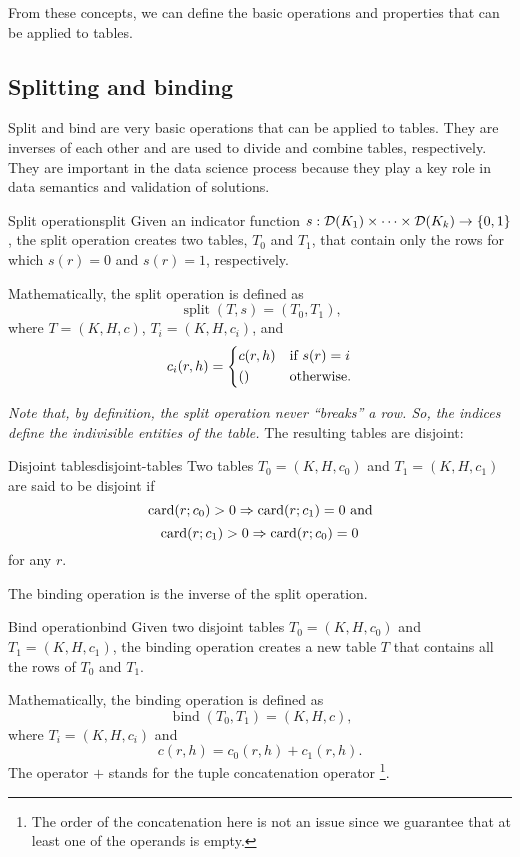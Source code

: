 From these concepts, we can define the basic operations and properties that can be applied
to tables.

\subsection{Splitting and binding}

Split and bind are very basic operations that can be applied to tables.  They are
inverses of each other and are used to divide and combine tables, respectively.
They are important in the data science process because they play a key role in
data semantics and validation of solutions.

\begin{defbox}{Split operation}{split}
Given an indicator function $s : \domainof{K_1} \times \dots \times \domainof{K_k} \to
\left\{0, 1\right\}$, the split operation creates two tables, $T_0$ and $T_1$, that
contain only the rows for which
$s(r) = 0$ and $s(r) = 1$, respectively.

Mathematically, the split operation is defined as \[
  \operatorname{split}(T, s) = \left(T_0, T_1\right)\text{,}
\] where $T = (K, H, c)$, $T_i = (K, H, c_i)$, and \[
  c_i(r, h) = \begin{dcases}
    c(r, h) & \text{if } s(r) = i \\
    () & \text{otherwise.}
  \end{dcases}
\]
\end{defbox}

\emph{Note that, by definition, the split operation never ``breaks'' a row.  So, the
indices define the indivisible entities of the table.}  The resulting tables are
disjoint:

\begin{defbox}{Disjoint tables}{disjoint-tables}
  Two tables $T_0 = (K, H, c_0)$ and $T_1 = (K, H, c_1)$ are said to be disjoint if
  $$\rowcard[r; c_0] > 0 \Rightarrow \rowcard[r; c_1] = 0\text{ and}$$
  $$\rowcard[r; c_1] > 0 \Rightarrow \rowcard[r; c_0] = 0$$ for any $r$.
\end{defbox}

The binding operation is the inverse of the split operation.

\begin{defbox}{Bind operation}{bind}
  Given two disjoint tables
  $T_0 = (K, H, c_0)$ and $T_1 = (K, H, c_1)$, the binding operation creates a new table $T$
  that contains all the rows of $T_0$ and $T_1$.

  Mathematically, the binding operation is defined as \[
    \operatorname{bind}(T_0, T_1) = (K, H, c)\text{,}
  \] where $T_i = (K, H, c_i)$ and \[ c(r, h) = c_0(r, h) + c_1(r, h)\text{.} \]
  The operator $+$ stands for the tuple concatenation operator%
  \footnote{The order of the concatenation here is not an issue since we guarantee
  that at least one of the operands is empty.}.
\end{defbox}

